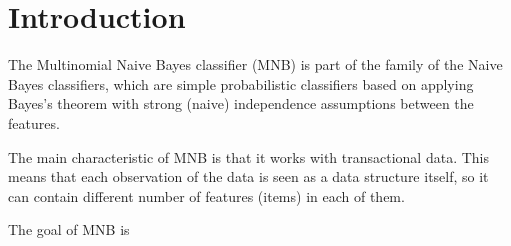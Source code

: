 \section{Introduction}
The Multinomial Naive Bayes classifier (MNB) is part of the family of the Naive Bayes classifiers, which are simple probabilistic classifiers based on applying Bayes's theorem with strong (naive) independence assumptions between the features.

The main characteristic of MNB is that it works with transactional data. This means that each observation of the data is seen as a data structure itself, so it can contain different number of features (items) in each of them. 

The goal of MNB is 